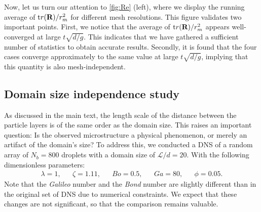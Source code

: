 Now, let us turn our attention to \ref{fig:Re} (left), where we display the running average of $\text tr(\textbf{R})/r_m^2$ for different mesh resolutions.  
This figure validates two important points. 
First, we notice that the average of $\text tr(\textbf{R})/r_m^2$ appears well-converged at large $t\sqrt{d/g}$. 
This indicates that we have gathered a sufficient number of statistics to obtain accurate results. 
Secondly, it is found that the four cases converge approximately to the same value at large  $t\sqrt{d/g}$, implying that this quantity is also mesh-independent. 

\subsection{ Domain size independence study}

As discussed in the main text, the length scale of the distance between the particle layers is of the same order as the domain size. 
This raises an important question: Is the observed microstructure a physical phenomenon, or merely an artifact of the domain's size?
To address this, we conducted a DNS of a random array of $N_b=800$ droplets with a domain size of $\mathcal{L}/d = 20$. With the following dimensionless parameters:
\begin{align*}
    \lambda = 1,
    && \zeta = 1.11,
    && Bo = 0.5,
    && Ga = 80,
    && \phi = 0.05. 
\end{align*}
Note that the \textit{Galileo} number and the \textit{Bond} number are slightly different than in the original set of DNS due to numerical constraints.
We expect that these changes are not significant, so that the comparison remains valuable.


